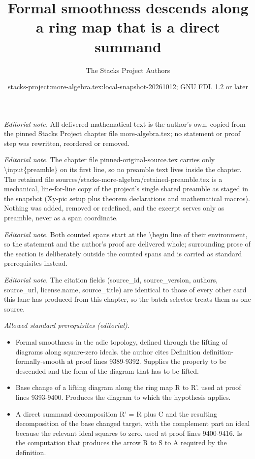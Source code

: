 \documentclass[10pt,a4paper]{amsart}
\title{Formal smoothness descends along a ring map that is a direct summand}
\author{The Stacks Project Authors}
\date{stacks-project:more-algebra.tex:local-snapshot-20261012; GNU FDL 1.2 or later}
\theoremstyle{plain}
\theoremstyle{definition}
\theoremstyle{remark}
\numberwithin{equation}{subsection}
\begin{document}
\maketitle
\setcounter{subsection}{1}
\noindent\textit{Editorial note.} All delivered mathematical text is the author's own, copied from the pinned Stacks Project chapter file more-algebra.tex; no statement or proof step was rewritten, reordered or removed.\par\medskip
\noindent\textit{Editorial note.} The chapter file pinned-original-source.tex carries only \textbackslash{}input\{preamble\} on its first line, so no preamble text lives inside the chapter. The retained file sources/stacks-more-algebra/retained-preamble.tex is a mechanical, line-for-line copy of the project's single shared preamble as staged in the snapshot (Xy-pic setup plus theorem declarations and mathematical macros). Nothing was added, removed or redefined, and the excerpt serves only as preamble, never as a span coordinate.\par\medskip
\noindent\textit{Editorial note.} Both counted spans start at the \textbackslash{}begin line of their environment, so the statement and the author's proof are delivered whole; surrounding prose of the section is deliberately outside the counted spans and is carried as standard prerequisites instead.\par\medskip
\noindent\textit{Editorial note.} The citation fields (source\_id, source\_version, authors, source\_url, license.name, source\_title) are identical to those of every other card this lane has produced from this chapter, so the batch selector treats them as one source.\par\medskip
\noindent\textit{Allowed standard prerequisites (editorial).}\begin{itemize}
\item Formal smoothness in the adic topology, defined through the lifting of diagrams along square-zero ideals. the author cites Definition definition-formally-smooth at proof lines 9389-9392. Supplies the property to be descended and the form of the diagram that has to be lifted.
\item Base change of a lifting diagram along the ring map R to R'. used at proof lines 9393-9400. Produces the diagram to which the hypothesis applies.
\item A direct summand decomposition R' = R plus C and the resulting decomposition of the base changed target, with the complement part an ideal because the relevant ideal squares to zero. used at proof lines 9400-9416. Is the computation that produces the arrow R to S to A required by the definition.
\end{itemize}\medskip
\end{document}
